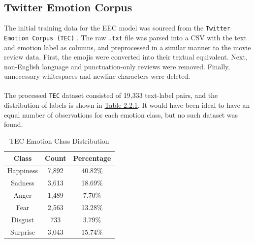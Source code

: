 \documentclass[11pt]{article}
\begin{document}
\subsection{Twitter Emotion Corpus}
The initial training data for the EEC model was sourced from the \texttt{Twitter Emotion Corpus (TEC)} \cite{mohammad-2012-emotional, Mohammad}. The raw \texttt{.txt} file was parsed into a CSV with the text and emotion label as columns, and preprocessed in a similar manner to the movie review data. First, the emojis were converted into their textual equivalent. Next, non-English language and punctuation-only reviews were removed. Finally, unnecessary whitespaces and newline characters were deleted. \\ \\
The processed \texttt{TEC} dataset consisted of 19,333 text-label pairs, and the distribution of labels is shown in \hyperref[tab:emotion_label_distribution]{Table 2.2.1}. It would have been ideal to have an equal number of observations for each emotion class, but no such dataset was found.
\renewcommand{\thetable}{2.2.1}
\begin{table}[h]
    	\centering
    	\begin{tabular}{c c c}
        		\toprule
        		\textbf{Class} & \textbf{Count} & \textbf{Percentage} \\
        		\midrule
        		Happiness & 7,892 & 40.82\% \\
        		Sadness & 3,613 & 18.69\% \\
        		Anger & 1,489 & 7.70\% \\
        		Fear & 2,563 & 13.28\% \\
        		Disgust & 733 & 3.79\% \\
        		Surprise & 3,043 & 15.74\% \\
        		\bottomrule
    	\end{tabular}
    	\caption{TEC Emotion Class Distribution}
	\label{tab:emotion_label_distribution}
\end{table}
\end{document}
